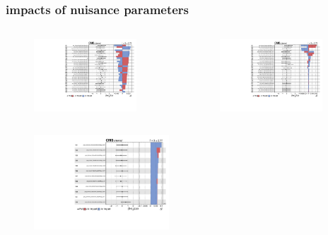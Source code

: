 \documentclass{beamer}
\begin{document}


\begin{frame}[label=impacts2]
\frametitle{impacts of nuisance parameters}
\vspace{-10pt}
\begin{columns}
	\begin{figure}
		\includegraphics[width=0.9\textwidth]{impacts5.pdf}
	\end{figure}
	\begin{figure}
		\includegraphics[width=0.9\textwidth]{impacts6.pdf}
	\end{figure}
\end{columns}
\vspace{-10pt}
\begin{figure}
	\includegraphics[width=0.45\textwidth]{impacts7.pdf}
\end{figure}\end{frame}





\end{document}
